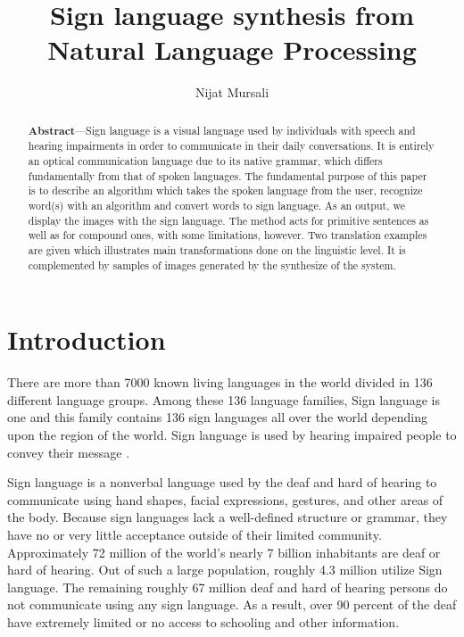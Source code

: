 \documentclass[twocolumn,10pt]{asme2ej}
\title{Sign language synthesis from Natural Language Processing}
\author{Nijat Mursali
\affiliation{
Department of Artificial Intelligence and Robotics\\
Sapienza University of Rome\\
}}
\begin{document}
\maketitle    

\begin{abstract}
{
{\bf Abstract}—Sign language is a visual language used by individuals with speech and hearing impairments in order to communicate in their daily conversations. It is entirely an optical communication language due to its native grammar, which differs fundamentally from that of spoken languages.
The fundamental purpose of this paper is to describe an algorithm which takes the spoken language from the user, recognize word(s) with an algorithm and convert words to sign language. As an output, we display the images with the sign language. The method acts for primitive sentences as well as for compound ones, with some limitations, however. Two translation examples are given which illustrates main transformations done on the linguistic level. It is complemented by samples of images generated by the synthesize of the system.
}
\end{abstract}

\section{Introduction}

There are more than 7000 known living languages in the world divided in 136 different language groups. Among these 136 language families, Sign language is one and this family contains 136 sign languages all over the world depending upon the region of the world. Sign language is used by hearing impaired people to convey their message \cite{tamer-saraclar-2020-cross}. 

Sign language is a nonverbal language used by the deaf and hard of hearing to communicate using hand shapes, facial expressions, gestures, and other areas of the body. Because sign languages lack a well-defined structure or grammar, they have no or very little acceptance outside of their limited community. Approximately 72 million of the world's nearly 7 billion inhabitants are deaf or hard of hearing. Out of such a large population, roughly 4.3 million utilize Sign language. The remaining roughly 67 million deaf and hard of hearing persons do not communicate using any sign language. As a result, over 90 percent of the deaf have extremely limited or no access to schooling and other information. 
\end{document}
